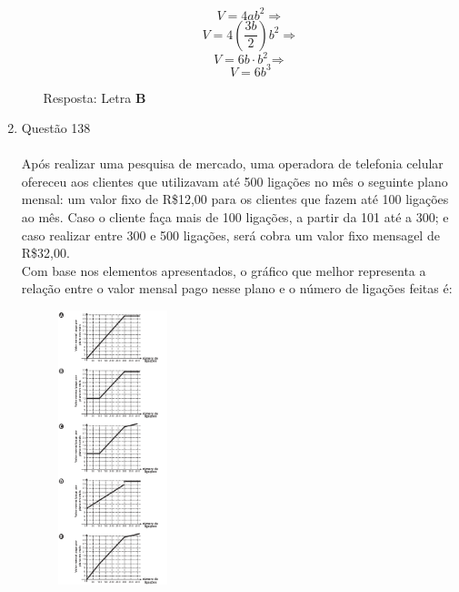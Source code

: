 \documentclass[a4paper, 12pt]{article}
\begin{document}
\begin{enumerate}
\begin{enumerate}
    $$V = 4ab^{2} \Rightarrow $$
    $$V = 4\left(\frac{3b}{2}\right)b^{2} \Rightarrow $$
    $$V = 6b \cdot b^{2} \Rightarrow $$
    $$\boxed{V = 6b^{3}} $$

    Resposta: Letra \textbf{B}
  \end{enumerate}  
\item Questão 138 \\\\
  Após realizar uma pesquisa de mercado, uma operadora de telefonia celular ofereceu aos clientes que utilizavam até 500 ligações no mês o seguinte plano mensal: um valor fixo de R\$12,00 para os clientes que fazem até 100 ligações ao mês. Caso o cliente faça mais de 100 ligações, a partir da 101 até a 300; e caso realizar entre 300 e 500 ligações, será cobra um valor fixo mensagel de R\$32,00.\\
  Com base nos elementos apresentados, o gráfico que melhor representa a relação entre o valor mensal pago nesse plano e o número de ligações feitas é:
   \begin{figure}[h!]
   \centering
   \includegraphics[width=0.3\textwidth]{2}
   \end{figure} \\\\
  

\end{enumerate}
\end{document}
